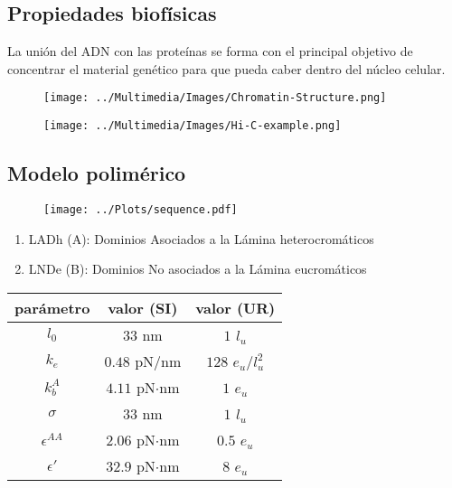 \documentclass{beamer}
\begin{document}
\subsection{Propiedades biofísicas}

\begin{frame}
    La unión del ADN con las proteínas se forma con el principal objetivo de \alert{concentrar} el material genético para que pueda caber dentro del núcleo celular.
    \begin{figure}
        \centering
        \texttt{[image: ../Multimedia/Images/Chromatin-Structure.png]}
    \end{figure}
\end{frame}

\begin{frame}
    \begin{figure}
        \centering
        \texttt{[image: ../Multimedia/Images/Hi-C-example.png]}
    \end{figure}
\end{frame}

\subsection{Modelo polimérico}

\begin{frame}
    \begin{figure}
        \centering
        \texttt{[image: ../Plots/sequence.pdf]}
    \end{figure}
    \begin{enumerate}
        \item LADh (A): Dominios Asociados a la Lámina heterocromáticos
        \item LNDe (B): Dominios No asociados a la Lámina eucromáticos
    \end{enumerate}
\end{frame}

\begin{frame}
    \begin{table}
        \centering
        \begin{tabular}{c c c}
            \toprule
            parámetro       & valor (SI)         & valor (UR)          \\
            \midrule
            $l_0$           & $33$ nm            & $1$ $l_u$           \\
            $k_e$           & $0.48$ pN/nm       & $128$ $e_u$/$l_u^2$ \\
            $k_b^A$         & $4.11$ pN$\cdot$nm & $1$ $e_u$           \\
            $\sigma$        & $33$ nm            & $1$ $l_u$           \\
            $\epsilon^{AA}$ & $2.06$ pN$\cdot$nm & $0.5$ $e_u$         \\
            $\epsilon'$     & $32.9$ pN$\cdot$nm & $8$ $e_u$           \\
            \bottomrule
        \end{tabular}
    \end{table}
\end{frame}
\end{document}
